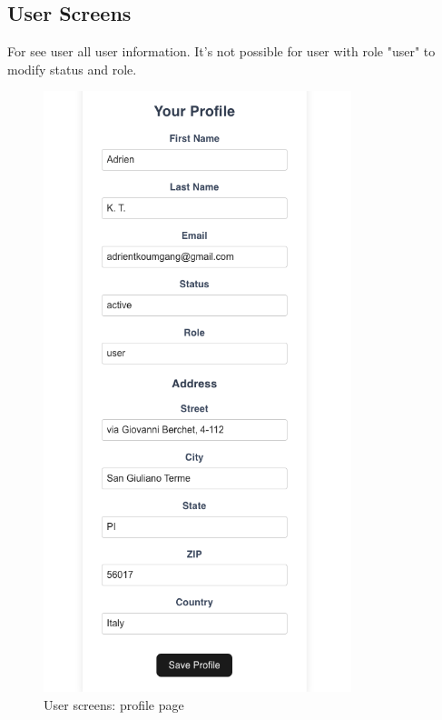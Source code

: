 \subsection{User Screens}\label{subsec:user-screens}

For see user all user information.
It's not possible for user with role "user" to modify status and role.

\begin{figure}[!h]
    \centering
    \begin{minipage}{0.48\linewidth}
        \centering
        \includegraphics[width=0.8\textwidth]{chapters/chapter_03/page/user/profile-page}
        \caption{User screens: profile page}
        \label{fig:profile-wireframes}
    \end{minipage}

\end{figure}
